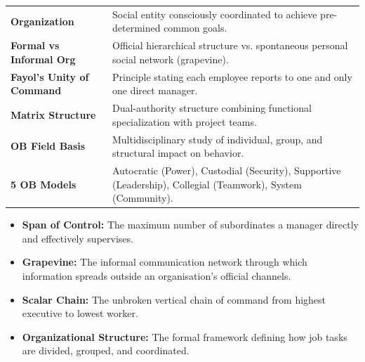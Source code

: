 \documentclass[11pt,a4paper]{article}
\begin{document}
\begin{tcolorbox}[formulabox, title={\textbf{Key Concepts and Metrics at a Glance}}]
\renewcommand{\arraystretch}{1.35}
\begin{tabularx}{\linewidth}{>{\raggedright\arraybackslash\bfseries}p{4.5cm} X}
Organization & Social entity consciously coordinated to achieve pre-determined common goals. \\[4pt]
Formal vs Informal Org & Official hierarchical structure vs. spontaneous personal social network (grapevine). \\[4pt]
Fayol's Unity of Command & Principle stating each employee reports to one and only one direct manager. \\[4pt]
Matrix Structure & Dual-authority structure combining functional specialization with project teams. \\[4pt]
OB Field Basis & Multidisciplinary study of individual, group, and structural impact on behavior. \\[4pt]
5 OB Models & Autocratic (Power), Custodial (Security), Supportive (Leadership), Collegial (Teamwork), System (Community). \\
\end{tabularx}
\end{tcolorbox}

\begin{tcolorbox}[defbox, title={\textbf{One-Line Definitions for Exam Revision}}]
  \begin{itemize}[leftmargin=*, itemsep=2pt]
    \item \textbf{Span of Control:} The maximum number of subordinates a manager directly and effectively supervises.
    \item \textbf{Grapevine:} The informal communication network through which information spreads outside an organisation's official channels.
    \item \textbf{Scalar Chain:} The unbroken vertical chain of command from highest executive to lowest worker.
    \item \textbf{Organizational Structure:} The formal framework defining how job tasks are divided, grouped, and coordinated.
  \end{itemize}
\end{tcolorbox}
\end{document}
